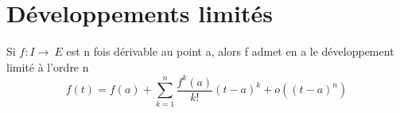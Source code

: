 
\section{Développements limités}








\begin{thm}
   Si $f : I \rightarrow~ E$ est n fois dérivable au point a, alors f
admet en a le développement limité à l'ordre n
\[
  f(t) = f(a) + \sum_{k=1}^{n} \frac{f^k(a)}{k!}(t - a)^k +
o((t - a)^n)
\]
\end{thm}

